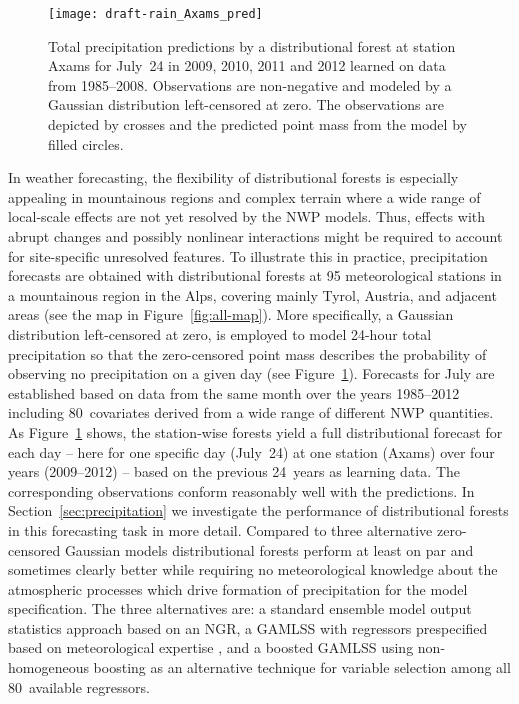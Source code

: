 \documentclass[aoas, preprint]{imsart}
\numberwithin{equation}{subsection}
\begin{document}
\begin{figure}[t!]
\centering
{}
\texttt{[image: draft-rain\_Axams\_pred]}
\caption{\label{fig:axams-dist}Total precipitation predictions by a 
distributional forest at station Axams for July~24 in 2009, 2010, 2011 and 
2012 learned on data from 1985--2008. Observations are non-negative and 
modeled by a Gaussian distribution left-censored at zero.
The observations are depicted by crosses and the predicted point mass
from the model by filled circles.}
\end{figure}

In weather forecasting, the flexibility of distributional forests is especially 
appealing in mountainous regions and complex terrain where a wide range of local-scale
effects are not yet resolved by the NWP models. 
Thus, effects with abrupt changes and possibly nonlinear interactions 
might be required to account for site-specific unresolved features.
To illustrate this in practice,
precipitation forecasts are obtained with distributional forests at 95
meteorological stations in a mountainous region in the Alps, covering mainly
Tyrol, Austria, and adjacent areas (see the map in Figure~\ref{fig:all-map}).
More specifically, a Gaussian distribution left-censored at zero, is employed 
to model 24-hour total precipitation so that the
zero-censored point mass describes the probability of observing no precipitation 
on a given day (see Figure~\ref{fig:axams-dist}). Forecasts for July are
established based on data from the same month over the years 1985--2012 including
80~covariates derived from a wide range of different NWP quantities. As
Figure~\ref{fig:axams-dist} shows, the station-wise forests yield a full
distributional forecast for each day -- here for one specific day (July~24) at one
station (Axams) over four years (2009--2012) -- based on the previous 24~years
as learning data. The corresponding observations conform reasonably well with
the predictions. In Section~\ref{sec:precipitation} we investigate the
performance of distributional forests in this forecasting task in more detail.
Compared to three alternative zero-censored Gaussian models distributional forests
perform at least on par and sometimes clearly better while requiring no meteorological
knowledge about the atmospheric processes which drive formation of precipitation
for the model specification. The three alternatives are: a standard ensemble model
output statistics approach \citep[EMOS,][]{Gneiting+Raftery+Westveld:2005} based
on an NGR, a GAMLSS with regressors prespecified based on meteorological expertise
\citep[following][]{Stauffer+Umlauf+Messner:2017}, and a boosted GAMLSS
\citep{Hofner+Mayr+Schmid:2016} using non-homogeneous boosting
\citep{Messner+Mayr+Zeileis:2017} as an alternative technique for variable selection 
among all 80~available regressors.
\end{document}
